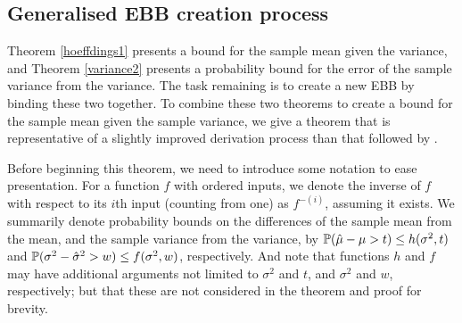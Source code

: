 \subsection{Generalised EBB creation process}\label{subsection:general_ebb_creation}

Theorem \ref{hoeffdings1} presents a bound for the sample mean given the variance, and Theorem \ref{variance2} presents a probability bound for the error of the sample variance from the variance. The task remaining is to create a new EBB by binding these two together.
To combine these two theorems to create a bound for the sample mean given the sample variance, we give a theorem that is representative of a slightly improved derivation process than that followed by \cite{Maurer50empiricalbernstein}.

Before beginning this theorem, we need to introduce some notation to ease presentation.
For a function $f$ with ordered inputs, we denote the inverse of $f$ with respect to its $i${th} input (counting from one) as $f^{-(i)}$, assuming it exists.
We summarily denote probability bounds on the differences of the sample mean from the mean, and the sample variance from the variance, by
$\operatorname{\mathbb{P}}(\hat{\mu}-\mu>t)\le h(\sigma^2,t)$ and $\operatorname{\mathbb{P}}(\sigma^2-\hat{\sigma}^2>w)\le f(\sigma^2,w)$, respectively.
And note that functions $h$ and $f$ may have additional arguments not limited to $\sigma^2$ and $t$, and $\sigma^2$ and $w$, respectively; but that these are not considered in the theorem and proof for brevity.

